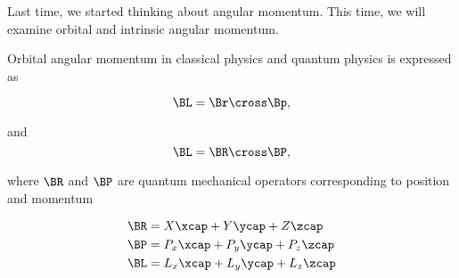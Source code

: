 %
%

Last time, we started thinking about angular momentum.  This time, we will examine orbital and intrinsic angular momentum.

Orbital angular momentum in classical physics and quantum physics is expressed as

\begin{equation}\label{eqn:PHY356Foct19:1000}
\BL = \Br \cross \Bp,
\end{equation}

and
\begin{equation}\label{eqn:PHY356Foct19:1001}
\BL = \BR \cross \BP,
\end{equation}

where \(\BR\) and \(\BP\) are quantum mechanical operators corresponding to position and momentum

\begin{equation}\label{eqn:PHY356Foct19:1002}
\begin{aligned}
\BR &= X \xcap + Y \ycap + Z \zcap \\
\BP &= P_x \xcap + P_y \ycap + P_z \zcap \\
\BL &= L_x \xcap + L_y \ycap + L_z \zcap
\end{aligned}
\end{equation}


